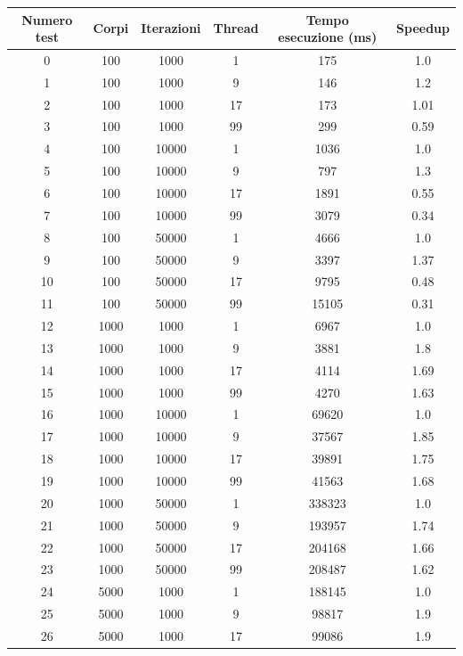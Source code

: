 \documentclass[12pt,a4paper,openright,twoside]{book}
\begin{document}
\begin{table}[h!]
	\centering
	\begin{tabular}{ |c|c|c|c|c|c| } 
		\hline
		Numero test & Corpi & Iterazioni & Thread & Tempo esecuzione (ms) & Speedup \\
		\hline
0 & 100 & 1000 & 1 & 175 & 1.0 \\ 
 \hline
1 & 100 & 1000 & 9 & 146 & 1.2 \\ 
 \hline
2 & 100 & 1000 & 17 & 173 & 1.01 \\ 
 \hline
3 & 100 & 1000 & 99 & 299 & 0.59 \\ 
 \hline
4 & 100 & 10000 & 1 & 1036 & 1.0 \\ 
 \hline
5 & 100 & 10000 & 9 & 797 & 1.3 \\ 
 \hline
6 & 100 & 10000 & 17 & 1891 & 0.55 \\ 
 \hline
7 & 100 & 10000 & 99 & 3079 & 0.34 \\ 
 \hline
8 & 100 & 50000 & 1 & 4666 & 1.0 \\ 
 \hline
9 & 100 & 50000 & 9 & 3397 & 1.37 \\ 
 \hline
10 & 100 & 50000 & 17 & 9795 & 0.48 \\ 
 \hline
11 & 100 & 50000 & 99 & 15105 & 0.31 \\ 
 \hline
12 & 1000 & 1000 & 1 & 6967 & 1.0 \\ 
 \hline
13 & 1000 & 1000 & 9 & 3881 & 1.8 \\ 
 \hline
14 & 1000 & 1000 & 17 & 4114 & 1.69 \\ 
 \hline
15 & 1000 & 1000 & 99 & 4270 & 1.63 \\ 
 \hline
16 & 1000 & 10000 & 1 & 69620 & 1.0 \\ 
 \hline
17 & 1000 & 10000 & 9 & 37567 & 1.85 \\ 
 \hline
18 & 1000 & 10000 & 17 & 39891 & 1.75 \\ 
 \hline
19 & 1000 & 10000 & 99 & 41563 & 1.68 \\ 
 \hline
20 & 1000 & 50000 & 1 & 338323 & 1.0 \\ 
 \hline
21 & 1000 & 50000 & 9 & 193957 & 1.74 \\ 
 \hline
22 & 1000 & 50000 & 17 & 204168 & 1.66 \\ 
 \hline
23 & 1000 & 50000 & 99 & 208487 & 1.62 \\ 
 \hline
24 & 5000 & 1000 & 1 & 188145 & 1.0 \\ 
 \hline
25 & 5000 & 1000 & 9 & 98817 & 1.9 \\ 
 \hline
26 & 5000 & 1000 & 17 & 99086 & 1.9 \\ 

\end{tabular}
\end{table}
\end{document}
